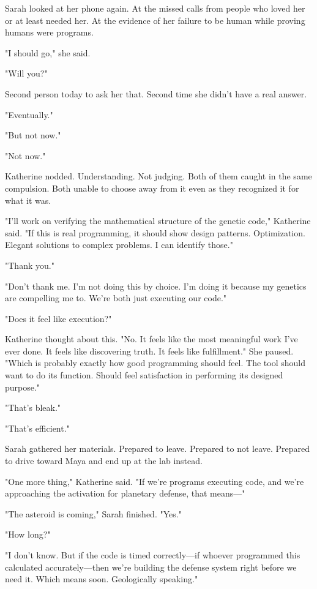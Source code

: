 Sarah looked at her phone again. At the missed calls from people who loved her or at least needed her. At the evidence of her failure to be human while proving humans were programs.

"I should go," she said.

"Will you?"

Second person today to ask her that. Second time she didn't have a real answer.

"Eventually."

"But not now."

"Not now."

Katherine nodded. Understanding. Not judging. Both of them caught in the same compulsion. Both unable to choose away from it even as they recognized it for what it was.

"I'll work on verifying the mathematical structure of the genetic code," Katherine said. "If this is real programming, it should show design patterns. Optimization. Elegant solutions to complex problems. I can identify those."

"Thank you."

"Don't thank me. I'm not doing this by choice. I'm doing it because my genetics are compelling me to. We're both just executing our code."

"Does it feel like execution?"

Katherine thought about this. "No. It feels like the most meaningful work I've ever done. It feels like discovering truth. It feels like fulfillment." She paused. "Which is probably exactly how good programming should feel. The tool should want to do its function. Should feel satisfaction in performing its designed purpose."

"That's bleak."

"That's efficient."

Sarah gathered her materials. Prepared to leave. Prepared to not leave. Prepared to drive toward Maya and end up at the lab instead.

"One more thing," Katherine said. "If we're programs executing code, and we're approaching the activation for planetary defense, that means—"

"The asteroid is coming," Sarah finished. "Yes."

"How long?"

"I don't know. But if the code is timed correctly—if whoever programmed this calculated accurately—then we're building the defense system right before we need it. Which means soon. Geologically speaking."

